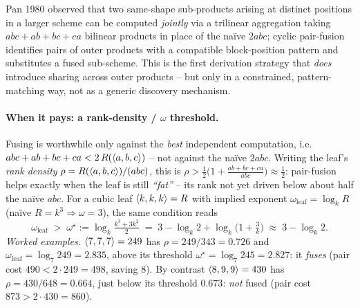 Pan 1980 \cite{pan1980} observed that two same-shape sub-products arising at distinct
positions in a larger scheme can be computed \emph{jointly} via a trilinear aggregation
taking \(a b c + a b + b c + c a\) bilinear products in place of the naïve \(2 a b c\);
cyclic pair-fusion identifies pairs of outer products with a compatible block-position
pattern and substitutes a fused sub-scheme. This is the first derivation strategy that
\emph{does} introduce sharing across outer products -- but only in a constrained,
pattern-matching way, not as a generic discovery mechanism.

\paragraph{When it pays: a rank-density / \(\omega\) threshold.}
Fusing is worthwhile only against the \emph{best} independent computation, i.e.
\(abc + ab + bc + ca < 2\,R(\langle a, b, c \rangle)\) -- not against the naïve \(2abc\).
Writing the leaf's \emph{rank density} \(\rho = R(\langle a, b, c \rangle)/(abc)\), this is
\(\rho > \tfrac{1}{2}\big(1 + \tfrac{ab+bc+ca}{abc}\big) \approx \tfrac{1}{2}\): pair-fusion
helps exactly when the leaf is still \emph{``fat''} -- its rank not yet driven below about
half the naïve \(abc\). For a cubic leaf \(\langle k, k, k \rangle=R\) with implied exponent
\(\omega_{\mathrm{leaf}} = \log_k R\) (naïve \(R=k^3\Rightarrow\omega=3\)), the same
condition reads
\[
  \omega_{\mathrm{leaf}} \;>\; \omega^\star := \log_k\!\tfrac{k^3+3k^2}{2}
  \;=\; 3 - \log_k 2 + \log_k\!\big(1+\tfrac{3}{k}\big) \;\approx\; 3 - \log_k 2 .
\]
\emph{Worked examples.} \(\langle 7, 7, 7 \rangle=249\) has \(\rho=249/343=0.726\) and
\(\omega_{\mathrm{leaf}}=\log_7 249=2.835\), above its threshold
\(\omega^\star=\log_7 245=2.827\): it \emph{fuses} (pair cost \(490 < 2\cdot 249 = 498\),
saving \(8\)). By contrast \(\langle 8, 9, 9 \rangle=430\) has \(\rho=430/648=0.664\), just
below its threshold \(0.673\): \emph{not} fused (pair cost \(873 > 2\cdot 430 = 860\)).

